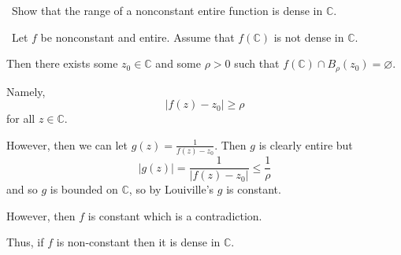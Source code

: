 \documentclass[12pt]{Qual}
\begin{document}
\begin{problem} $\,$
Show that the range of a nonconstant entire function is dense in $\mathbb{C}$.
\end{problem}


\begin{solution}$\,$
Let $f$ be nonconstant and entire. Assume that $f(\mathbb{C})$ is not dense in $\mathbb{C}$.

Then there exists some $z_0\in\mathbb{C}$ and some $\rho>0$ such that $f(\mathbb{C})\cap B_\rho(z_0)=\varnothing$.

Namely, $$|f(z)-z_0|\ge\rho$$ for all $z\in\mathbb{C}$.

However, then we can let $g(z)=\frac{1}{f(z)-z_0}$. Then $g$ is clearly entire but $$|g(z)|=\frac{1}{|f(z)-z_0|}\le\frac{1}{\rho}$$ and so $g$ is bounded on $\mathbb{C}$, so by Louiville's $g$ is constant.

However, then $f$ is constant which is a contradiction.

Thus, if $f$ is non-constant then it is dense in $\mathbb{C}$.

\end{solution}
\end{document}
